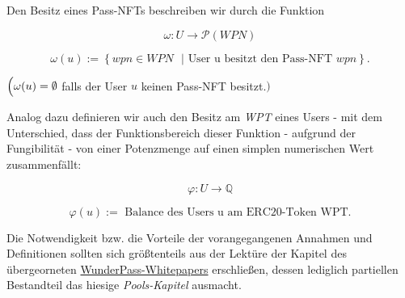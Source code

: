 \begin{Def}
Den Besitz eines Pass-NFTs beschreiben wir durch die Funktion 

\vspace{0.2cm}

\begin{equation*}
  \omega : U \rightarrow \mathcal{P} \left( WPN \right)  
\end{equation*}

\begin{equation*}
  \omega(u):= \left\{ wpn \in WPN \text{ } | \text{ User u besitzt den Pass-NFT } wpn \right\}. 
\end{equation*}

$\Bigl( \omega(u) = \emptyset$ falls der User $u$ keinen Pass-NFT besitzt.$\Bigr)$

\vspace{0.4cm}

Analog dazu definieren wir auch den Besitz am \textit{WPT} eines Users - mit dem Unterschied, dass der Funktionsbereich dieser Funktion - aufgrund der Fungibilität - von einer Potenzmenge auf einen simplen numerischen Wert zusammenfällt:

\vspace{0.2cm}

\begin{equation*}
  \varphi : U \rightarrow \mathbb{Q}  
\end{equation*}

\begin{equation*}
  \varphi(u):= \text{ Balance des Users u am ERC20-Token WPT}. 
\end{equation*}

\end{Def}

\vspace{0.2cm}

Die Notwendigkeit bzw. die Vorteile der vorangegangenen Annahmen und Definitionen sollten sich größtenteils aus der Lektüre der Kapitel des übergeorneten \href{https://github.com/WunderPass/White-Paper/blob/main/paper.pdf}{WunderPass-Whitepapers} erschließen, dessen lediglich partiellen Bestandteil das hiesige \textit{Pools-Kapitel} ausmacht. 

\vspace{0.5cm}